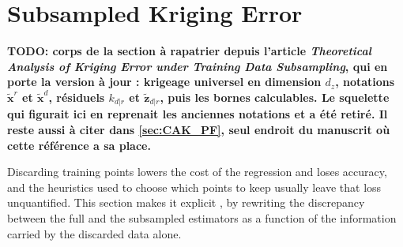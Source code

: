 \section{Subsampled Kriging Error}\label{sec:subsampling_error}

\textbf{TODO: corps de la section à rapatrier depuis l'article \textit{Theoretical Analysis of
Kriging Error under Training Data Subsampling}, qui en porte la version à jour :
krigeage universel en dimension $d_z$, notations $\tilde{\mathbf{x}}^r$ et
$\tilde{\mathbf{x}}^d$, résiduels $k_{d|r}$ et $\tilde{\mathbf{z}}_{d|r}$, puis les bornes
calculables. Le squelette qui figurait ici en reprenait les anciennes notations et a été retiré.
Il reste aussi à citer \cite{bib:AK-PF-clustered} dans \cref{sec:CAK_PF}, seul endroit du
manuscrit où cette référence a sa place.}

Discarding training points lowers the cost of the regression and loses accuracy, and the heuristics used to choose which points to keep usually leave that loss unquantified. This section makes it explicit \cite{bib:kriging-subsampling}, by rewriting the discrepancy between the full and the subsampled estimators as a function of the information carried by the discarded data alone.
